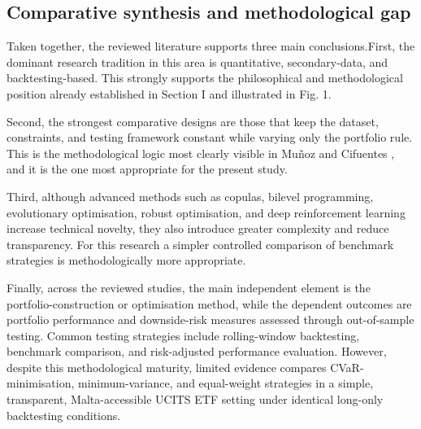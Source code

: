 \subsection{Comparative synthesis and methodological gap}
\label{subsec:lit-gap}
\par Taken together, the reviewed literature supports three main conclusions.First, the dominant research tradition in this area is quantitative, secondary-data, and backtesting-based. This strongly supports the philosophical and methodological position already established in Section I and illustrated in Fig. 1.
\par Second, the strongest comparative designs are those that keep the dataset, constraints, and testing framework constant while varying only the portfolio rule. This is the methodological logic most clearly visible in Muñoz and Cifuentes \cite{munoz2026riskmetrics}, and it is the one most appropriate for the present study.
\par Third, although advanced methods such as copulas, bilevel programming, evolutionary optimisation, robust optimisation, and deep reinforcement learning increase technical novelty, they also introduce greater complexity and reduce transparency. For this research a simpler controlled comparison of benchmark strategies is methodologically more appropriate.
\par Finally, across the reviewed studies, the main independent element is the portfolio-construction or optimisation method, while the dependent outcomes are portfolio performance and downside-risk measures assessed through out-of-sample testing. Common testing strategies include rolling-window backtesting, benchmark comparison, and risk-adjusted performance evaluation. However, despite this methodological maturity, limited evidence compares CVaR-minimisation, minimum-variance, and equal-weight strategies in a simple, transparent, Malta-accessible UCITS ETF setting under identical long-only backtesting conditions.


